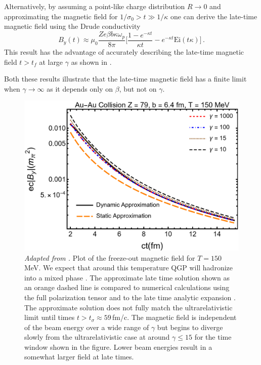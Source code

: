 Alternatively, by assuming a point-like charge distribution $R\rightarrow0$ and approximating the magnetic field for $ 1/\sigma_0 > t\gg 1/\kappa$ one can derive the late-time magnetic field using the Drude conductivity 
\begin{equation}\label{eq:latetimeB}
   B_y(t) \approx  \mu_0 \frac{ Ze \beta b \kappa \omega_p }{8\pi}\bigg[ \frac{1- e^{-\kappa t}}{\kappa t} - e^{-\kappa t} \text{Ei}\left(t\kappa\right)\bigg]\,.
\end{equation}
This result has the advantage of accurately describing the late-time magnetic field $t>t_f$  at large $\gamma$ as shown in .

Both these results illustrate that the late-time magnetic field has a finite limit when $\gamma\rightarrow\infty$ as it depends only on $\beta$, but not on $\gamma$.
\begin{figure}
\centering
\includegraphics[width=0.85\linewidth]{plots/chap02QCD/bfgaamacomp.png}
    \caption{\textit{Adapted from \cite{Grayson:2022asf}.} Plot of the freeze-out magnetic field for $T= 150$\,MeV. We expect that around this temperature QGP will hadronize into a mixed phase \cite{Letessier:1992xd}. The approximate late time solution  shown as an orange dashed line is compared to numerical calculations using the full polarization tensor  and to the late time analytic expansion . The approximate solution does not fully match the ultrarelativistic limit until times $t > t_{\sigma} \approx 59$\,fm/c. The magnetic field is independent of the beam energy over a wide range of $\gamma$ but begins to diverge slowly from the ultrarelativistic case at around $\gamma \leq 15$ for the time window shown in the figure. Lower beam energies result in a somewhat larger field at late times.\label{fig:bcolcomp}}
\end{figure}
